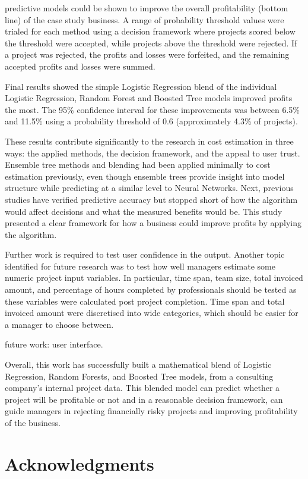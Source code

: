 \documentclass[]{elsarticle} %
\begin{document}
predictive models could be shown to improve the overall profitability
(bottom line) of the case study business. A range of probability
threshold values were trialed for each method using a decision framework
where projects scored below the threshold were accepted, while projects
above the threshold were rejected. If a project was rejected, the
profits and losses were forfeited, and the remaining accepted profits
and losses were summed.

Final results showed the simple Logistic Regression blend of the
individual Logistic Regression, Random Forest and Boosted Tree models
improved profits the most. The 95\% confidence interval for these
improvements was between 6.5\% and 11.5\% using a probability threshold
of 0.6 (approximately 4.3\% of projects).

These results contribute significantly to the research in cost
estimation in three ways: the applied methods, the decision framework,
and the appeal to user trust. Ensemble tree methods and blending had
been applied minimally to cost estimation previously, even though
ensemble trees provide insight into model structure while predicting at
a similar level to Neural Networks. Next, previous studies have verified
predictive accuracy but stopped short of how the algorithm would affect
decisions and what the measured benefits would be. This study presented
a clear framework for how a business could improve profits by applying
the algorithm.

Further work is required to test user confidence in the output. Another
topic identified for future research was to test how well managers
estimate some numeric project input variables. In particular, time span,
team size, total invoiced amount, and percentage of hours completed by
professionals should be tested as these variables were calculated post
project completion. Time span and total invoiced amount were discretised
into wide categories, which should be easier for a manager to choose
between.

future work: user interface.

Overall, this work has successfully built a mathematical blend of
Logistic Regression, Random Forests, and Boosted Tree models, from a
consulting company's internal project data. This blended model can
predict whether a project will be profitable or not and in a reasonable
decision framework, can guide managers in rejecting financially risky
projects and improving profitability of the business.

\section{Acknowledgments}\label{acknowledgments}
\end{document}
